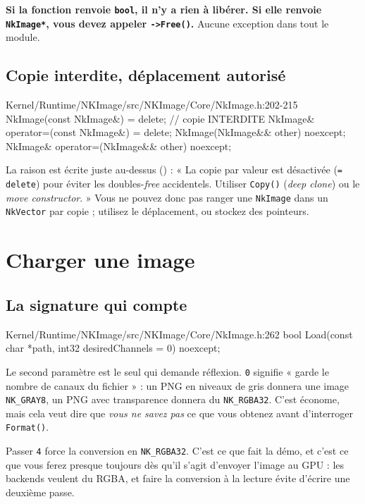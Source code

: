 \begin{nkretenir}
\textbf{Si la fonction renvoie \texttt{bool}, il n'y a rien à libérer. Si elle
renvoie \texttt{NkImage*}, vous devez appeler \texttt{->Free()}.} Aucune
exception dans tout le module.
\end{nkretenir}

\subsection{Copie interdite, déplacement autorisé}

\begin{nkcode}{Kernel/Runtime/NKImage/src/NKImage/Core/NkImage.h:202-215}
NkImage(const NkImage&) = delete;                 // copie INTERDITE
NkImage& operator=(const NkImage&) = delete;
NkImage(NkImage&& other) noexcept;
NkImage& operator=(NkImage&& other) noexcept;
\end{nkcode}

La raison est écrite juste au-dessus () : « La
copie par valeur est désactivée (\texttt{= delete}) pour éviter les
doubles-\emph{free} accidentels. Utiliser \texttt{Copy()} (\emph{deep clone}) ou
le \emph{move constructor}. » Vous ne pouvez donc pas ranger une
\texttt{NkImage} dans un \texttt{NkVector} par copie ; utilisez le déplacement,
ou stockez des pointeurs.

\section{Charger une image}

\subsection{La signature qui compte}

\begin{nkcode}{Kernel/Runtime/NKImage/src/NKImage/Core/NkImage.h:262}
bool Load(const char *path, int32 desiredChannels = 0) noexcept;
\end{nkcode}

Le second paramètre est le seul qui demande réflexion. \texttt{0} signifie
« garde le nombre de canaux du fichier » : un PNG en niveaux de gris donnera une
image \texttt{NK\_GRAY8}, un PNG avec transparence donnera du
\texttt{NK\_RGBA32}. C'est économe, mais cela veut dire que \emph{vous ne savez
pas} ce que vous obtenez avant d'interroger \texttt{Format()}.

Passer \texttt{4} force la conversion en \texttt{NK\_RGBA32}. C'est ce que fait
la démo, et c'est ce que vous ferez presque toujours dès qu'il s'agit d'envoyer
l'image au GPU : les backends veulent du RGBA, et faire la conversion à la
lecture évite d'écrire une deuxième passe.

